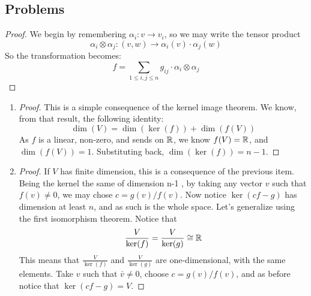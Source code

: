 \subsection{Problems}
\begin{problem}
\end{problem}

\begin{proof}
	We begin by remembering $\alpha_i: v \to v_i$, so we may write the tensor product
	$$\alpha_i \otimes \alpha_j: (v,w) \to \alpha_i(v)\cdot \alpha_j(w)$$
	So the transformation becomes:
	$$f = \sum_{1 \leq i,j \leq n} g_{ij} \cdot \alpha_i \otimes \alpha_j$$
\end{proof}

\begin{problem}
\end{problem}
\begin{enumerate}[label=(\alph*)]
	\item \begin{proof}
		      This is a simple consequence of the kernel image theorem. We know, from that result, the following identity:
		      $$\dim(V) = \dim(\ker(f)) + \dim(f(V))$$
		      As $f$ is a linear, non-zero, and sends on $\mathbb{R}$, we know $f(V) = \mathbb{R}$, and $\dim(f(V)) = 1$. Substituting back,
		      $\dim(\ker(f)) = n - 1$.
	      \end{proof}
	\item \begin{proof}
		      If $V$ has finite dimension, this is a consequence of the previous item. Being the kernel the same of dimension n-1 ,
		      by taking any vector $v$  such that $f(v) \neq 0$, we may chose $c = g(v)/f(v)$. Now notice $\ker(cf - g)$ has dimension
		      at least $n$, and as such is the whole space. Let's generalize using the first isomorphism theorem. Notice that
		      $$\frac{V}{\ker(f)} = \frac{V}{\ker(g)} \cong \mathbb{R}$$
		      This means that $\frac{V}{\ker(f)}$ and $\frac{V}{\ker(g)}$ are one-dimensional, with the same elements. Take
		      $v$ such that $\bar{v} \neq 0$, choose $c = g(v)/f(v)$, and as before notice that $\ker(cf - g) = V$.
	      \end{proof}
\end{enumerate}

\begin{problem}
\end{problem}
